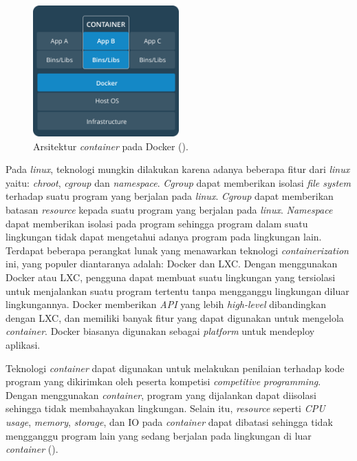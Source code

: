 \begin{figure}
	\centering
	\includegraphics[width=0.5\textwidth]{images/docker-architecture}
	\caption{Arsitektur \textit{container} pada Docker (\cite{dockerdocs}).}
	\label{fig:docker-architecture}
\end{figure}

\par Pada \textit{linux}, teknologi mungkin dilakukan karena adanya beberapa fitur dari \textit{linux} yaitu: \textit{chroot}, \textit{cgroup} dan \textit{namespace}. \textit{Cgroup} dapat memberikan isolasi \textit{file system} terhadap suatu program yang berjalan pada \textit{linux}. \textit{Cgroup} dapat memberikan batasan \textit{resource} kepada suatu program yang berjalan pada \textit{linux}. \textit{Namespace} dapat memberikan isolasi pada program sehingga program dalam suatu lingkungan tidak dapat mengetahui adanya program pada lingkungan lain. Terdapat beberapa perangkat lunak yang menawarkan teknologi \textit{containerization} ini, yang populer diantaranya adalah: Docker dan LXC. Dengan menggunakan Docker atau LXC, pengguna dapat membuat suatu lingkungan yang tersiolasi untuk menjalankan suatu program tertentu tanpa mengganggu lingkungan diluar lingkungannya. Docker memberikan \textit{API} yang lebih \textit{high-level} dibandingkan dengan LXC, dan memiliki banyak fitur yang dapat digunakan untuk mengelola \textit{container}. Docker biasanya digunakan sebagai \textit{platform} untuk mendeploy aplikasi.

\par Teknologi \textit{container} dapat digunakan untuk melakukan penilaian terhadap kode program yang dikirimkan oleh peserta kompetisi \textit{competitive programming}. Dengan menggunakan \textit{container}, program yang dijalankan dapat diisolasi sehingga tidak membahayakan lingkungan. Selain itu, \textit{resource} seperti \textit{CPU usage}, \textit{memory}, \textit{storage}, dan IO pada \textit{container} dapat dibatasi sehingga tidak mengganggu program lain yang sedang berjalan pada lingkungan di luar \textit{container} (\cite{merkeldocker}).

